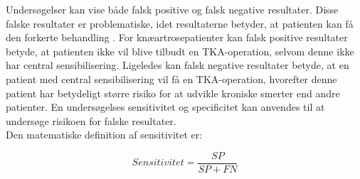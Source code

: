 
Undersøgelser kan vise både falsk positive og falsk negative resultater. Disse falske resultater er problematiske, idet resultaterne betyder, at patienten kan få den forkerte behandling \citep{Lalkhen2008}. For knæartrosepatienter kan falsk positive resultater betyde, at patienten ikke vil blive tilbudt en TKA-operation, selvom denne ikke har central sensibilisering. Ligeledes kan falsk negative resultater betyde, at en patient med central sensibilisering vil få en TKA-operation, hvorefter denne patient har betydeligt større risiko for at udvikle kroniske smerter end andre patienter. En undersøgelses sensitivitet og specificitet kan anvendes til at undersøge risikoen for falske resultater. \\
Den matematiske definition af sensitivitet er: \\
\begin{center}
	\begin{equation}
	Sensitivitet=\frac{SP}{SP+FN}
	\end{equation}
\end{center}

